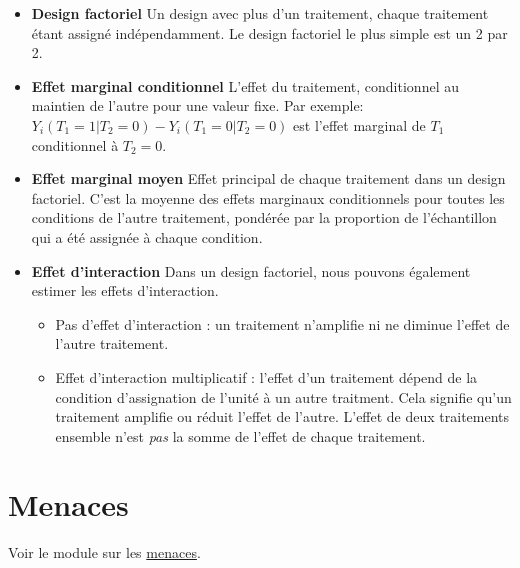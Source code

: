 \documentclass[
  12pt,
]{book}
\providecommand{\tightlist}{%
  \setlength{\itemsep}{0pt}\setlength{\parskip}{0pt}}
\begin{document}
\begin{itemize}
\item
  \textbf{Design factoriel} Un design avec plus d'un traitement, chaque traitement étant assigné indépendamment. Le design factoriel le plus simple est un 2 par 2.
\item
  \textbf{Effet marginal conditionnel} L'effet du traitement, conditionnel au maintien de l'autre pour une valeur fixe.
  Par exemple: \(Y_i(T_1=1|T_2=0)-Y_i(T_1=0|T_2=0)\) est l'effet marginal de \(T_1\) conditionnel à \(T_2=0\).
\item
  \textbf{Effet marginal moyen} Effet principal de chaque traitement dans un design factoriel.
  C'est la moyenne des effets marginaux conditionnels pour toutes les conditions de l'autre traitement, pondérée par la proportion de l'échantillon qui a été assignée à chaque condition.
\item
  \textbf{Effet d'interaction} Dans un design factoriel, nous pouvons également estimer les effets d'interaction.

  \begin{itemize}
  \tightlist
  \item
    Pas d'effet d'interaction : un traitement n'amplifie ni ne diminue l'effet de l'autre traitement.
  \item
    Effet d'interaction multiplicatif : l'effet d'un traitement dépend de la condition d'assignation de l'unité à un autre traitment.
    Cela signifie qu'un traitement amplifie ou réduit l'effet de l'autre. L'effet de deux traitements ensemble n'est \emph{pas} la somme de l'effet de chaque traitement.
  \end{itemize}
\end{itemize}

\hypertarget{menaces}{%
\section{Menaces}\label{menaces}}

Voir le module sur les \href{threats-to-internal-validity-of-randomized-experiments.html}{menaces}.
\end{document}
